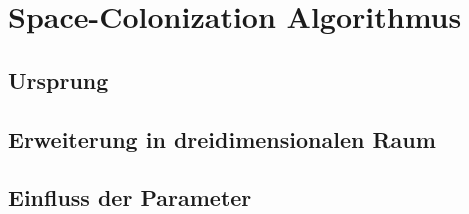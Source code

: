 \chapter{Space-Colonization Algorithmus}

\section{Ursprung}

\section{Erweiterung in dreidimensionalen Raum}

\section{Einfluss der Parameter}